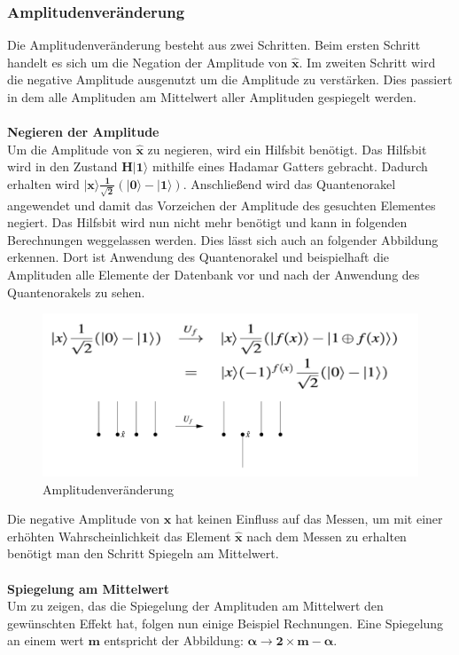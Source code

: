 \subsubsection{Amplitudenveränderung}
Die Amplitudenveränderung besteht aus zwei Schritten. Beim ersten Schritt handelt es sich um die Negation der Amplitude von $\mathbf{\hat x}$. Im zweiten Schritt wird die negative Amplitude ausgenutzt um die Amplitude zu verstärken. Dies passiert in dem alle Amplituden am Mittelwert aller Amplituden gespiegelt werden. 
\\ \\
\textbf{Negieren der Amplitude}
 \\
Um die Amplitude von $\mathbf{\hat x}$ zu negieren, wird ein Hilfsbit benötigt. Das Hilfsbit wird in den Zustand $\mathbf{H|1\rangle}$ mithilfe eines Hadamar Gatters gebracht. Dadurch erhalten wird $\mathbf{|x\rangle \frac{1}{\sqrt 2}(|0\rangle - |1\rangle )}$. Anschließend wird das Quantenorakel angewendet und damit das Vorzeichen der Amplitude des gesuchten Elementes negiert. Das Hilfsbit wird nun nicht mehr benötigt und kann in folgenden Berechnungen weggelassen werden. Dies lässt sich auch an folgender Abbildung erkennen. Dort ist Anwendung des Quantenorakel und beispielhaft die Amplituden alle Elemente der Datenbank vor und nach der Anwendung des Quantenorakels zu sehen.
\begin{figure}[hbtp]
	\centering
	\includegraphics[width=.8\textwidth]{figures/amplitudenveraenderung.png}
	\caption{Amplitudenveränderung}
	\label{fig:changeAmplitude}
\end{figure}
Die negative Amplitude von $\mathbf{\hat x}$ hat keinen Einfluss auf das Messen, um mit einer erhöhten Wahrscheinlichkeit das Element $\mathbf{\hat x}$ nach dem Messen zu erhalten benötigt man den Schritt Spiegeln am Mittelwert.
\\\\
\textbf{Spiegelung am Mittelwert} \\
\label{sec:spiegelnAmMittelwert}
Um zu zeigen, das die Spiegelung der Amplituden am Mittelwert den gewünschten Effekt hat, folgen nun einige Beispiel Rechnungen. Eine Spiegelung an einem wert $\mathbf{m}$ entspricht der Abbildung: $\mathbf{\alpha \rightarrow 2 \times m - \alpha}$. \\
